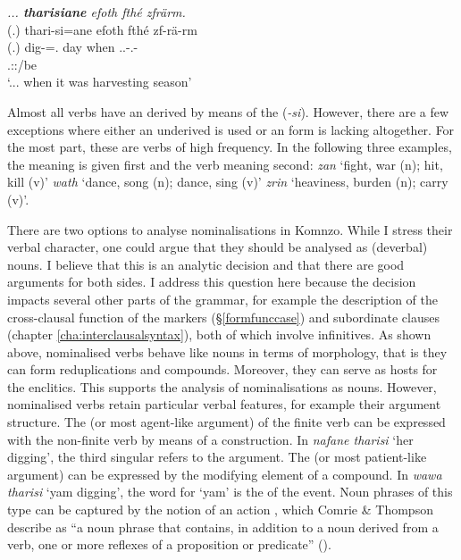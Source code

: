 \begin{exe}
	\ex \textit{... \textbf{tharisiane} efoth fthé zfrärm.}\\
	\glll (.) thari-si=ane efoth fthé zf-rä-rm\\
	(.) dig-\Nmlz{}=\Poss.\Sg{} day when \Tsg.\F.\Betatwo-\Cop.\Ndu-\Dur\\
	{} {} {} {} \footnotesize{\Tsg.\F:\Pst:\Dur/be}\\
	\trans `... when it was harvesting season' 
	\label{ex011}
\end{exe}

Almost all verbs have an  derived by means of the  (\emph{-si}). However, there are a few exceptions where either an underived  is used or an  form is lacking altogether. For the most part, these are verbs of high frequency. In the following three examples, the  meaning is given first and the verb meaning second: \emph{zan} `fight, war (n); hit, kill (v)' \emph{wath} `dance, song (n); dance, sing (v)' \emph{zrin} `heaviness, burden (n); carry (v)'.%

There are two options to analyse nominalisations in Komnzo. While I stress their verbal character, one could argue that they should be analysed as (deverbal) nouns. I believe that this is an analytic decision and that there are good arguments for both sides. I address this question here because the decision impacts several other parts of the grammar, for example the description of the cross-clausal function of the  markers (\S\ref{formfunccase}) and subordinate clauses (chapter \ref{cha:interclausalsyntax}), both of which involve infinitives. As shown above, nominalised verbs behave like nouns in terms of morphology, that is they can form reduplications and  compounds. Moreover, they can serve as hosts for the  enclitics. This supports the analysis of nominalisations as nouns. However, nominalised verbs retain particular verbal features, for example their argument structure. The  (or most agent-like argument) of the finite verb can be expressed with the non-finite verb by means of a  construction. In \emph{nafane tharisi} `her digging', the third singular  refers to the  argument. The  (or most patient-like argument) can be expressed by the modifying element of a  compound. In \emph{wawa tharisi} `yam digging', the word for `yam' is the  of the event. Noun phrases of this type can be captured by the notion of an action , which Comrie \& Thompson describe as ``a noun phrase that contains, in addition to a noun derived from a verb, one or more reflexes of a proposition or predicate'' (\citeyear[343]{Comrie:2007nom}).%

